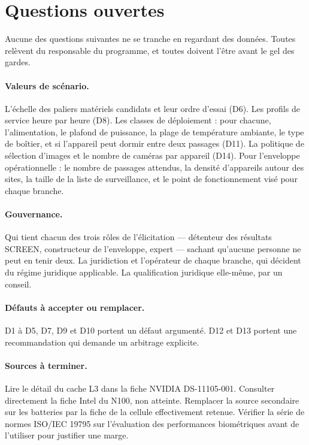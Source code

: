 \documentclass[11pt,a4paper]{article}
\begin{document}
\section{Questions ouvertes}\label{sec:questions}

Aucune des questions suivantes ne se tranche en regardant des données. Toutes
relèvent du responsable du programme, et toutes doivent l'être avant le gel des gardes.

\paragraph{Valeurs de scénario.} L'échelle des paliers matériels candidats et leur
ordre d'essai (D6). Les profils de service heure par heure (D8). Les classes de
déploiement : pour chacune, l'alimentation, le plafond de puissance, la plage de
température ambiante, le type de boîtier, et si l'appareil peut dormir entre deux
passages (D11). La politique de sélection d'images et le nombre de caméras par appareil
(D14). Pour l'enveloppe opérationnelle : le nombre de passages attendus, la densité
d'appareils autour des sites, la taille de la liste de surveillance, et le point de
fonctionnement visé pour chaque branche.

\paragraph{Gouvernance.} Qui tient chacun des trois rôles de l'élicitation — détenteur
des résultats SCREEN, constructeur de l'enveloppe, expert — sachant qu'aucune personne
ne peut en tenir deux. La juridiction et l'opérateur de chaque branche, qui décident
du régime juridique applicable. La qualification juridique elle-même, par un conseil.

\paragraph{Défauts à accepter ou remplacer.} D1 à D5, D7, D9 et D10 portent un défaut
argumenté. D12 et D13 portent une recommandation qui demande un arbitrage explicite.

\paragraph{Sources à terminer.} Lire le détail du cache L3 dans la fiche NVIDIA
DS-11105-001. Consulter directement la fiche Intel du N100, non atteinte. Remplacer la
source secondaire sur les batteries par la fiche de la cellule effectivement retenue.
Vérifier la série de normes ISO/IEC 19795 sur l'évaluation des performances
biométriques avant de l'utiliser pour justifier une marge.
\end{document}
